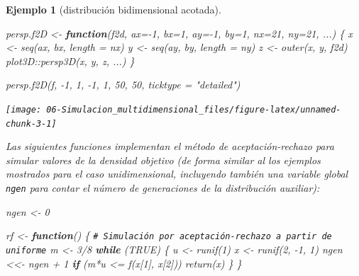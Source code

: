 \documentclass[
  10pt,
]{book}
\newenvironment{Shaded}{\begin{snugshade}}{\end{snugshade}}
\newcommand{\AttributeTok}[1]{\textcolor[rgb]{0.77,0.63,0.00}{#1}}
\newcommand{\CommentTok}[1]{\textcolor[rgb]{0.56,0.35,0.01}{\textit{#1}}}
\newcommand{\ConstantTok}[1]{\textcolor[rgb]{0.00,0.00,0.00}{#1}}
\newcommand{\ControlFlowTok}[1]{\textcolor[rgb]{0.13,0.29,0.53}{\textbf{#1}}}
\newcommand{\DecValTok}[1]{\textcolor[rgb]{0.00,0.00,0.81}{#1}}
\newcommand{\FunctionTok}[1]{\textcolor[rgb]{0.00,0.00,0.00}{#1}}
\newcommand{\NormalTok}[1]{#1}
\newcommand{\OtherTok}[1]{\textcolor[rgb]{0.56,0.35,0.01}{#1}}
\newcommand{\SpecialCharTok}[1]{\textcolor[rgb]{0.00,0.00,0.00}{#1}}
\newcommand{\StringTok}[1]{\textcolor[rgb]{0.31,0.60,0.02}{#1}}
\theoremstyle{break}
\newtheorem{example}{Ejemplo}[chapter]
\theoremstyle{nonumberplain}
\renewcommand{\CommentTok}[1]{\textcolor[rgb]{0.41,0.41,0.41}{\texttt{#1}}}
\begin{document}
\begin{example}[distribución bidimensional acotada]
\begin{Shaded}
\begin{Highlighting}[]
\NormalTok{persp.f2D }\OtherTok{\textless{}{-}} \ControlFlowTok{function}\NormalTok{(f2d, }\AttributeTok{ax=}\SpecialCharTok{{-}}\DecValTok{1}\NormalTok{, }\AttributeTok{bx=}\DecValTok{1}\NormalTok{, }\AttributeTok{ay=}\SpecialCharTok{{-}}\DecValTok{1}\NormalTok{, }\AttributeTok{by=}\DecValTok{1}\NormalTok{, }\AttributeTok{nx=}\DecValTok{21}\NormalTok{, }\AttributeTok{ny=}\DecValTok{21}\NormalTok{, ...) \{ }
\NormalTok{  x }\OtherTok{\textless{}{-}} \FunctionTok{seq}\NormalTok{(ax, bx, }\AttributeTok{length =}\NormalTok{ nx)}
\NormalTok{  y }\OtherTok{\textless{}{-}} \FunctionTok{seq}\NormalTok{(ay, by, }\AttributeTok{length =}\NormalTok{ ny)}
\NormalTok{  z }\OtherTok{\textless{}{-}} \FunctionTok{outer}\NormalTok{(x, y, f2d)}
\NormalTok{  plot3D}\SpecialCharTok{::}\FunctionTok{persp3D}\NormalTok{(x, y, z, ...)}
\NormalTok{\}}

\FunctionTok{persp.f2D}\NormalTok{(f, }\SpecialCharTok{{-}}\DecValTok{1}\NormalTok{, }\DecValTok{1}\NormalTok{, }\SpecialCharTok{{-}}\DecValTok{1}\NormalTok{, }\DecValTok{1}\NormalTok{, }\DecValTok{50}\NormalTok{, }\DecValTok{50}\NormalTok{, }\AttributeTok{ticktype =} \StringTok{"detailed"}\NormalTok{)}
\end{Highlighting}
\end{Shaded}

\begin{center}\texttt{[image: 06-Simulacion\_multidimensional\_files/figure-latex/unnamed-chunk-3-1]} \end{center}

Las siguientes funciones implementan el método de aceptación-rechazo para simular
valores de la densidad objetivo (de forma similar al los ejemplos mostrados
para el caso unidimensional, incluyendo también una variable global \texttt{ngen}
para contar el número de generaciones de la distribución auxiliar):

\begin{Shaded}
\begin{Highlighting}[]
\NormalTok{ngen }\OtherTok{\textless{}{-}} \DecValTok{0} 

\NormalTok{rf }\OtherTok{\textless{}{-}} \ControlFlowTok{function}\NormalTok{() \{}
  \CommentTok{\# Simulación por aceptación{-}rechazo a partir de uniforme}
\NormalTok{  m }\OtherTok{\textless{}{-}} \DecValTok{3}\SpecialCharTok{/}\DecValTok{8}
  \ControlFlowTok{while}\NormalTok{ (}\ConstantTok{TRUE}\NormalTok{) \{}
\NormalTok{    u }\OtherTok{\textless{}{-}} \FunctionTok{runif}\NormalTok{(}\DecValTok{1}\NormalTok{)}
\NormalTok{    x }\OtherTok{\textless{}{-}} \FunctionTok{runif}\NormalTok{(}\DecValTok{2}\NormalTok{, }\SpecialCharTok{{-}}\DecValTok{1}\NormalTok{, }\DecValTok{1}\NormalTok{)}
\NormalTok{    ngen }\OtherTok{\textless{}\textless{}{-}}\NormalTok{ ngen }\SpecialCharTok{+} \DecValTok{1}
    \ControlFlowTok{if}\NormalTok{ (m}\SpecialCharTok{*}\NormalTok{u }\SpecialCharTok{\textless{}=} \FunctionTok{f}\NormalTok{(x[}\DecValTok{1}\NormalTok{], x[}\DecValTok{2}\NormalTok{])) }\FunctionTok{return}\NormalTok{(x)}
\NormalTok{  \}}
\NormalTok{\}}


\end{Highlighting}
\end{Shaded}
\end{example}
\end{document}
